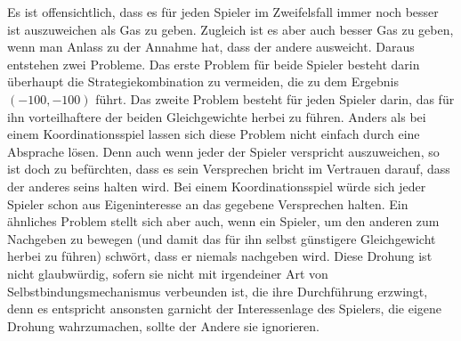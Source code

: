 Es ist offensichtlich, dass es für jeden Spieler im Zweifelsfall immer noch
besser ist auszuweichen als Gas zu geben. Zugleich ist es aber auch besser Gas
zu geben, wenn man Anlass zu der Annahme hat, dass der andere ausweicht. Daraus
entstehen zwei Probleme. Das erste Problem für beide Spieler besteht darin
überhaupt die Strategiekombination zu vermeiden, die zu dem Ergebnis
$(-100,-100)$ führt. Das zweite Problem besteht für jeden Spieler darin, das
für ihn vorteilhaftere der beiden Gleichgewichte herbei zu führen. Anders als
bei einem Koordinationsspiel lassen sich diese Problem nicht einfach durch eine
Absprache lösen. Denn auch wenn jeder der Spieler verspricht auszuweichen, so
ist doch zu befürchten, dass es sein Versprechen bricht im Vertrauen darauf,
dass der anderes seins halten wird. Bei einem Koordinationsspiel würde sich
jeder Spieler schon aus Eigeninteresse an das gegebene Versprechen halten. Ein
ähnliches Problem stellt sich aber auch, wenn ein Spieler, um den anderen zum
Nachgeben zu bewegen (und damit das für ihn selbst günstigere
Gleichgewicht herbei zu führen) schwört, dass er niemals nachgeben wird. Diese
Drohung ist nicht glaubwürdig, sofern sie nicht mit irgendeiner Art von
Selbstbindungsmechanismus verbeunden ist, die ihre Durchführung erzwingt, denn
es entspricht ansonsten garnicht der Interessenlage des Spielers, die eigene
Drohung wahrzumachen, sollte der Andere sie ignorieren.


